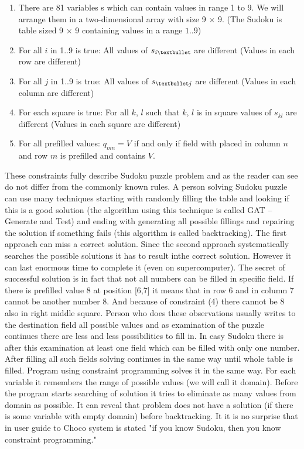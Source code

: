 \begin{enumerate}
\item	There are 81 variables s which can contain values in range 1 to 9. We will 
      arrange them in a two-dimensional array with size 9 $\times$ 9. 
      (The Sudoku is table sized 9 $\times$ 9 containing values in a range $1..9$)
\item	For all $i$ in 1..9 is true: All values of $s_{i \textbullet}$ are different 
      (Values in each row are different)
\item	For all $j$ in 1..9 is true: All values of $s_{\textbullet j}$ are different 
      (Values in each column are different)
\item	For each square is true: For all $k$, $l$ such that $k$, $l$ is in square values of 
      $s_{kl}$ are different (Values in each square are different)
\item	For all prefilled values: $q_{mn} = V$ if and only if field with placed in column 
      $n$ and row $m$ is prefilled and contains $V$.
\end{enumerate}

These constraints fully describe Sudoku puzzle problem and as the reader can see 
do not differ from the commonly known rules. A person solving Sudoku puzzle can 
use many techniques starting with randomly filling the table and looking if this 
is a good solution (the algorithm using this technique is called GAT -- Generate and Test) 
and ending with generating all possible fillings and repairing the solution if 
something fails (this algorithm is called backtracking). The first approach can miss 
a correct solution. Since the second approach systematically searches the possible 
solutions it has to result inthe correct solution. However it can last enormous 
time to complete it (even on supercomputer). The secret of successful solution 
is in fact that not all numbers can be filled in specific field. If there is 
prefilled value 8 at position [6,7] it means that in row 6 and in column 7 
cannot be another number 8. And because of constraint (4) there cannot be 8 
also in right middle square. Person who does these observations usually writes 
to the destination field all possible values and as examination of the puzzle 
continues there are less and less possibilities to fill in. In easy Sudoku there 
is after this examination at least one field which can be filled with only one 
number. After filling all such fields solving continues in the same way until 
whole table is filled. Program using constraint programming solves it in the same 
way. For each variable it remembers the range of possible values (we will call it 
domain). Before the program starts searching of solution it tries to eliminate as 
many values from domain as possible. It can reveal that problem does not have a 
solution (if there is some variable with empty domain) before backtracking. It 
it is no surprise that in user guide to Choco system is stated "if you know Sudoku, 
then you know constraint programming."

